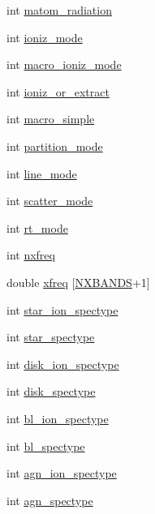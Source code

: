 \begin{DoxyCompactItemize}
\item 
int \hyperlink{structgeometry_a4b97dc16b54fd49d53a06ff8896596a6}{matom\+\_\+radiation}
\item 
int \hyperlink{structgeometry_a98d8096a2c1b3144efd5899f25402f7d}{ioniz\+\_\+mode}
\item 
int \hyperlink{structgeometry_a6735e2a8fa651fb48d5ef05a0fda8bde}{macro\+\_\+ioniz\+\_\+mode}
\item 
int \hyperlink{structgeometry_a1cdd3c658ff714b9504c7ada69ae1f0d}{ioniz\+\_\+or\+\_\+extract}
\item 
int \hyperlink{structgeometry_ac453ab1a6ed3b90674cd6552c0185bff}{macro\+\_\+simple}
\item 
int \hyperlink{structgeometry_ae14099bb9c9edf24ac997cf8f30c7aaf}{partition\+\_\+mode}
\item 
int \hyperlink{structgeometry_a723a95d320445157000eca0048dde821}{line\+\_\+mode}
\item 
int \hyperlink{structgeometry_a7bb30712978aacfba1b0fe69c33d22bc}{scatter\+\_\+mode}
\item 
int \hyperlink{structgeometry_a27207d7b4e1bef1c57a659354ff5cee9}{rt\+\_\+mode}
\item 
int \hyperlink{structgeometry_ae7fb58fc78cd9fa02941f1996777efeb}{nxfreq}
\item 
double \hyperlink{structgeometry_aaf647ea9c7e3521a4063a0966cbe35e7}{xfreq} \mbox{[}\hyperlink{python_8h_ac640b7fc429348ef2f6781704d3c5163}{N\+X\+B\+A\+N\+DS}+1\mbox{]}
\item 
int \hyperlink{structgeometry_a8213a23b93a44b9b491ac7257a395cc4}{star\+\_\+ion\+\_\+spectype}
\item 
int \hyperlink{structgeometry_a38ee7d8d2a6a863cd437dcafc58ebc10}{star\+\_\+spectype}
\item 
int \hyperlink{structgeometry_a26dae1a21b09843524328ec2dd1d2467}{disk\+\_\+ion\+\_\+spectype}
\item 
int \hyperlink{structgeometry_a03d95e2ef842e21fb07e2076ab560c98}{disk\+\_\+spectype}
\item 
int \hyperlink{structgeometry_a426a5fb9dc534d2694f69876813018cf}{bl\+\_\+ion\+\_\+spectype}
\item 
int \hyperlink{structgeometry_ad8186bf06722e4d1fda29b9162374596}{bl\+\_\+spectype}
\item 
int \hyperlink{structgeometry_a1a4a8d26f1fd2a1ea7973d62d7abfc8d}{agn\+\_\+ion\+\_\+spectype}
\item 
int \hyperlink{structgeometry_af4e6a2e8c84eebc16bd93c17899c124f}{agn\+\_\+spectype}

\end{DoxyCompactItemize}

